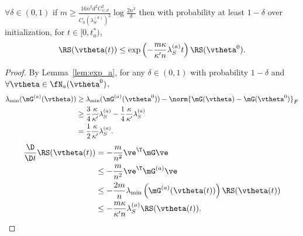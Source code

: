 \documentclass{article}
\begin{document}
\begin{thm}
    $\forall\delta\in(0,1)$ if $m\geq\frac{16n^2d^2C_{\psi,d}^2}{C_0(\lambda_S^{(a)})^2}\log\frac{2n^2}{\delta}$ then with probability at least $1-\delta$ over initialization, for $t\in[0,t^*_a)$,
    \begin{equation}
        \RS(\vtheta(t))\leq\exp\left(-\frac{m\kappa}{\kappa'n}\lambda_S^{(a)}t\right)\RS(\vtheta^0).
    \end{equation}
\end{thm}
\begin{proof}
    By Lemma~\ref{lem:exp_a}, for any $\delta\in(0,1)$ with probability $1-\delta$ and $\forall\vtheta\in\fN_a(\vtheta^0)$,
    \begin{equation}
        \begin{aligned}
            \lambda_{\text{min}}(\mG^{(a)}(\vtheta))
             & \geq\lambda_{\text{min}}(\mG^{(a)}(\vtheta^0))-\norm{\mG(\vtheta)-\mG(\vtheta^0)}_F                    \\
             & \geq \frac{3}{4}\frac{\kappa}{\kappa'}\lambda_S^{(a)}-\frac{1}{4}\frac{\kappa}{\kappa'}\lambda_S^{(a)} \\
             & = \frac{1}{2}\frac{\kappa}{\kappa'}\lambda_S^{(a)}.
        \end{aligned}
    \end{equation}
    \begin{equation}
        \begin{aligned}
            \frac{\D}{\D t}\RS(\vtheta(t))
             & = -\frac{m}{n^2}\ve^{\T}\mG\ve                                                          \\
             & \leq -\frac{m}{n^2}\ve^{\T}\mG^{(a)}\ve                                                 \\
             & \leq -\frac{2m}{n}\lambda_{\text{min}}\left(\mG^{(a)}(\vtheta(t))\right)\RS(\vtheta(t)) \\
             & \leq -\frac{m\kappa}{\kappa'n}\lambda_S^{(a)}\RS(\vtheta(t)).
        \end{aligned}
    \end{equation}
\end{proof}
\end{document}
